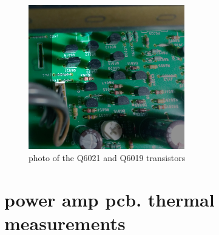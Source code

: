 \documentclass[a4paper,twoside]{report}
\begin{document}
\begin{figure}[hptb!]
\centering
 \includegraphics[width=6.8cm, keepaspectratio=true]{img_report/main_pcb_l.png}
 \caption{photo of the Q6021 and Q6019 transistors}
\end{figure}


\section{power amp pcb. thermal measurements} \label{sec:pwr-thermal-measurements}

\end{document}
